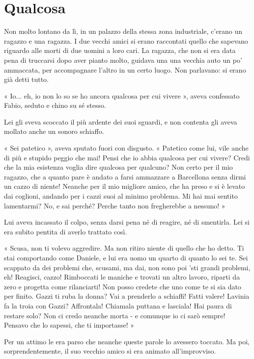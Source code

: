 \chapter{Qualcosa}

Non molto lontano da lì, in un palazzo della stessa zona industriale, c'erano un ragazzo e una ragazza. I due vecchi amici si erano raccontati quello che sapevano riguardo alle morti di due uomini a loro cari. La ragazza, che non si era data pena di truccarsi dopo aver pianto molto, guidava una una vecchia auto un po' ammaccata, per accompagnare l'altro in un certo luogo. Non parlavano: si erano già detti tutto.

« Io... eh, io non lo so se ho ancora qualcosa per cui vivere », aveva confessato Fabio, seduto e chino su sé stesso.

Lei gli sveva scoccato il più ardente dei suoi sguardi, e non contenta gli aveva mollato anche un sonoro schiaffo.

« Sei patetico », aveva sputato fuori con disgusto. « Patetico come lui, vile anche di più e stupido peggio che mai! Pensi che io abbia qualcosa per cui vivere? Credi che la mia esistenza voglia dire qualcosa per qualcuno? Non certo per il mio ragazzo, che a quanto pare è andato a farsi ammazzare a Barcellona senza dirmi un cazzo di niente! Neanche per il mio migliore amico, che ha preso e si è levato dai coglioni, andando per i cazzi suoi al minimo problema. Mi hai mai sentito lamentarmi? No, e sai perché? Perche tanto non fregherebbe a nessuno! »

Lui aveva incassato il colpo, senza darsi pena né di reagire, né di smentirla. Lei si era subito pentita di averlo trattato così.

« Scusa, non ti volevo aggredire. Ma non ritiro niente di quello che ho detto. Ti stai comportando come Daniele, e lui era uomo un quarto di quanto lo sei te. Sei scappato da dei problemi che, scusami, ma dai, non sono poi 'sti grandi problemi, eh! Reagisci, cazzo! Rimboccati le maniche e trovati un altro lavoro, riparti da zero e progetta come rilanciarti! Non posso credete che uno come te si sia dato per finito. Gazzi ti ruba la donna? Vai a prenderlo a schiaffi! Fatti valere! Lavinia fa la troia con Gazzi? Affrontala! Chiamala puttana e lasciala! Hai paura di restare solo? Non ci credo neanche morta - e comunque io ci sarò sempre! Pensavo che lo sapessi, che ti importasse! »

Per un attimo le era parso che neanche queste parole lo avessero toccato. Ma poi, sorprendentemente, il suo vecchio amico si era animato all'improvviso.

